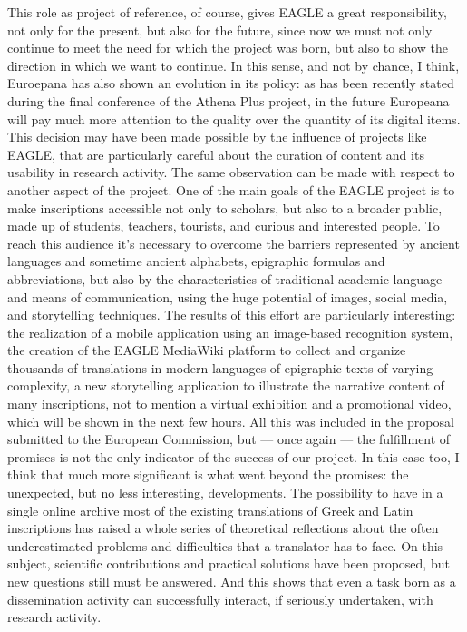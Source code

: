 This role as project of reference, of course, gives EAGLE a great responsibility, not only for the present, but also for the future, since now we must not only continue to meet the need for which the project was born, but also to show the direction in which we want to continue.
In this sense, and not by chance, I think, Euroepana has also shown an evolution in its policy: as has been recently stated during the final conference of the Athena Plus project, in the future Europeana will pay much more attention to the quality over the quantity of its digital items. This decision may have been made possible by the influence of projects like EAGLE, that are particularly careful about the curation of content and its usability in research activity.
The same observation can be made with respect to another aspect of the project. One of the main goals of the EAGLE project is to make inscriptions accessible not only to scholars, but also to a broader public, made up of students, teachers, tourists, and curious and interested people. To reach this audience it’s necessary to overcome the barriers represented by ancient languages and sometime ancient alphabets, epigraphic formulas and abbreviations, but also by the characteristics of traditional academic language and means of communication, using the huge potential of images, social media, and storytelling techniques. The results of this effort are particularly interesting: the realization of a mobile application using an image-based recognition system, the creation of the EAGLE MediaWiki platform to collect and organize thousands of translations in modern languages of epigraphic texts of varying complexity, a new storytelling application to illustrate the narrative content of many inscriptions, not to mention a virtual exhibition and a promotional video, which will be shown in the next few hours.
All this was included in the proposal submitted to the European Commission, but --- once again --- the fulfillment of promises is not the only indicator of the success of our project.  In this case too, I think that much more significant is what went beyond the promises: the unexpected, but no less interesting, developments. 
The possibility to have in a single online archive most of the existing translations of Greek and Latin inscriptions has raised a whole series of theoretical reflections about the often underestimated problems and difficulties that a translator has to face. On this subject, scientific contributions and practical solutions have been proposed, but new questions still must be answered. And this shows that even a task born as a dissemination activity can successfully interact, if seriously undertaken, with research activity.
